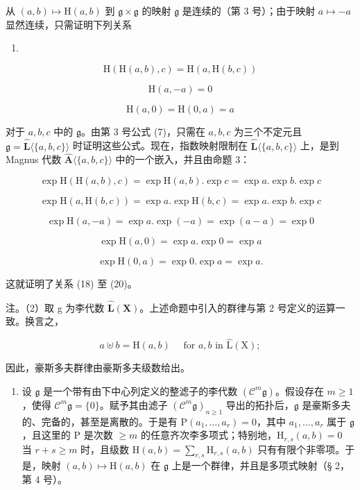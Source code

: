 从 \((a, b) \mapsto \mathrm{H}(a, b)\) 到 \(\mathfrak{g} \times \mathfrak{g}\) 的映射 \(\mathfrak{g}\) 是连续的（第 3 号）；由于映射 \(a \mapsto -a\) 显然连续，只需证明下列关系

\begin{enumerate}
\def\labelenumi{(\arabic{enumi})}
\setcounter{enumi}{17}
\tightlist
\item
\end{enumerate}

\[
\mathrm{H} (\mathrm{H} (a, b), c) = \mathrm{H} (a, \mathrm{H} (b, c))\tag{18}
\]

\[
\mathrm{H} (a, - a) = 0\tag{19}
\]

\[
\mathrm{H} (a, 0) = \mathrm{H} (0, a) = a\tag{20}
\]

对于 \(a, b, c\) 中的 \(\mathfrak{g}\)。由第 3 号公式 (7)，只需在 \(a, b, c\) 为三个不定元且 \(\mathfrak{g} = \hat{\mathbf{L}}\langle \{a, b, c\}\rangle\) 时证明这些公式。现在，指数映射限制在 \(\hat{\mathbf{L}}\langle \{a, b, c\}\rangle\) 上，是到 Magnus 代数 \(\hat{\mathbf{A}}\langle \{a, b, c\}\rangle\) 中的一个嵌入，并且由命题 3：

\[
\exp \mathrm{H} (\mathrm{H} (a, b), c) = \exp \mathrm{H} (a, b). \exp c = \exp a. \exp b. \exp c
\]

\[
\exp \mathrm{H} (a, \mathrm{H} (b, c)) = \exp a. \exp \mathrm{H} (b, c) = \exp a. \exp b. \exp c
\]

\[
\exp \mathrm{H} (a, - a) = \exp a. \exp (- a) = \exp (a - a) = \exp 0
\]

\[
\exp \mathrm{H} (a, 0) = \exp a. \exp 0 = \exp a
\]

\[
\exp \mathrm{H} (0, a) = \exp 0. \exp a = \exp a.
\]

这就证明了关系 (18) 至 (20)。

注。（2）取 g 为李代数 \(\hat{\mathbf{L}}(\mathbf{X})\)。上述命题中引入的群律与第 2 号定义的运算一致。换言之，

\[
a \uplus b = \mathrm{H} (a, b) \quad \text { for   } a, b \text {   in   } \hat {\mathrm{L}} (\mathrm{X});\tag{21}
\]

因此，豪斯多夫群律由豪斯多夫级数给出。

\begin{enumerate}
\def\labelenumi{(\arabic{enumi})}
\setcounter{enumi}{2}
\tightlist
\item
  设 \(\mathfrak{g}\) 是一个带有由下中心列定义的整滤子的李代数 \((\mathcal{C}^m\mathfrak{g})\)。假设存在 \(m \geqslant 1\)，使得 \(\mathcal{C}^m\mathfrak{g} = \{0\}\)。赋予其由滤子 \((\mathcal{C}^m\mathfrak{g})_{n \geqslant 1}\) 导出的拓扑后，\(\mathfrak{g}\) 是豪斯多夫的、完备的，甚至是离散的。于是有 \(\mathrm{P}(a_1, \ldots, a_r) = 0\)，其中 \(a_1, \ldots, a_r\) 属于 \(\mathfrak{g}\)，且这里的 \(\mathrm{P}\) 是次数 \(\geqslant m\) 的任意齐次李多项式；特别地，\(\mathrm{H}_{r,s}(a, b) = 0\) 当 \(r + s \geqslant m\) 时，且级数 \(\mathrm{H}(a, b) = \sum_{r,s} \mathrm{H}_{r,s}(a, b)\) 只有有限个非零项。于是，映射 \((a, b) \mapsto \mathrm{H}(a, b)\) 在 \(\mathfrak{g}\) 上是一个群律，并且是多项式映射（§ 2，第 4 号）。
\end{enumerate}

